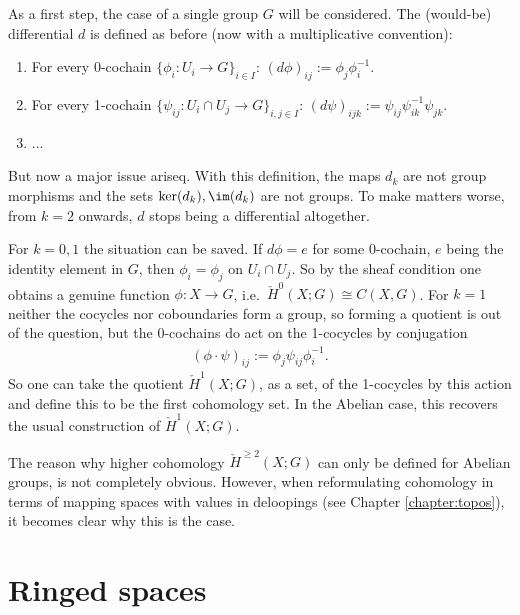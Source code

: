     As a first step, the case of a single group $G$ will be considered. The (would-be) differential $d$ is defined as before (now with a multiplicative convention):
    \begin{enumerate}
        \item For every 0-cochain $\{\phi_i:U_i\rightarrow G\}_{i\in I}$: $(d\phi)_{ij}:=\phi_j\phi^{-1}_i$.
        \item For every 1-cochain $\{\psi_{ij}:U_i\cap U_j\rightarrow G\}_{i,j\in I}$: $(d\psi)_{ijk} := \psi_{ij}\psi^{-1}_{ik}\psi_{jk}$.
        \item ...
    \end{enumerate}
    But now a major issue ariseq. With this definition, the maps $d_k$ are not group morphisms and the sets $\ker(d_k),\im(d_k)$ are not groups. To make matters worse, from $k=2$ onwards, $d$ stops being a differential altogether.

    For $k=0,1$ the situation can be saved. If $d\phi=e$ for some 0-cochain, $e$ being the identity element in $G$, then $\phi_i=\phi_j$ on $U_i\cap U_j$. So by the sheaf condition one obtains a genuine function $\phi:X\rightarrow G$, i.e.~$\check{H}^0(X;G)\cong C(X,G)$. For $k=1$ neither the cocycles nor coboundaries form a group, so forming a quotient is out of the question, but the 0-cochains do act on the 1-cocycles by conjugation
    \begin{gather}
        (\phi\cdot\psi)_{ij} := \phi_j\psi_{ij}\phi^{-1}_i.
    \end{gather}
    So one can take the quotient $\check{H}^1(X;G)$, as a set, of the 1-cocycles by this action and define this to be the first cohomology set. In the Abelian case, this recovers the usual construction of $\check{H}^1(X;G)$.

    \begin{remark*}
        The reason why higher cohomology $\check{H}^{\geq2}(X;G)$ can only be defined for Abelian groups, is not completely obvious. However, when reformulating cohomology in terms of mapping spaces with values in deloopings (see Chapter \ref{chapter:topos}), it becomes clear why this is the case.
    \end{remark*}

\section{Ringed spaces}


